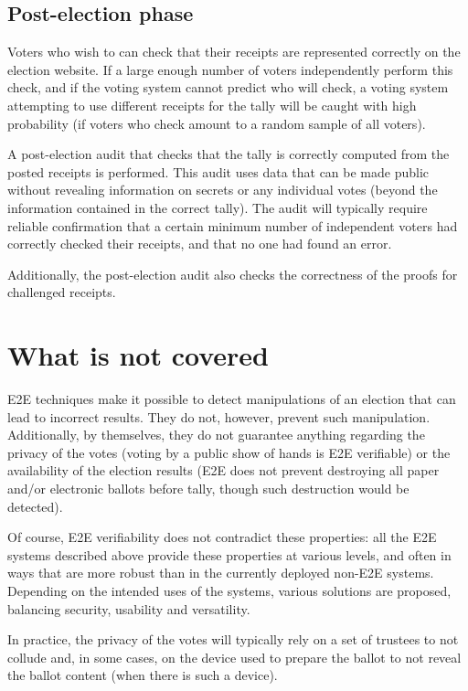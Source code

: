 \subsection{Post-election phase}

Voters who wish to can check that their receipts are represented correctly
on the election website. If a large enough number of voters independently
perform this check, and if the voting system cannot predict who will check,
a voting system attempting to use different receipts for the tally will be
caught with high probability (if voters who check amount to a random sample
of all voters).

A post-election audit that checks that the tally is correctly computed from
the posted receipts is performed. This audit uses data that can be made
public without revealing information on secrets or any individual votes
(beyond the information contained in the correct tally). The audit will
typically require reliable confirmation that a certain minimum number of
independent voters had correctly checked their receipts, and that no one had
found an error.

Additionally, the post-election audit also checks the correctness of the
proofs for challenged receipts.

\section{What is not covered}

E2E techniques make it possible to detect manipulations of an election that
can lead to incorrect results. They do not, however, prevent such
manipulation. Additionally, by themselves, they do not guarantee anything
regarding the privacy of the votes (voting by a public show of hands is E2E
verifiable) or the availability of the election results (E2E does not
prevent destroying all paper and/or electronic ballots before tally, though
such destruction would be detected).

Of course, E2E verifiability does not contradict these properties: all the
E2E systems described above provide these properties at various levels, and
often in ways that are more robust than in the currently deployed non-E2E
systems. Depending on the intended uses of the systems, various solutions
are proposed, balancing security, usability and versatility.

In practice, the privacy of the votes will typically rely on a set of
trustees to not collude and, in some cases, on the device used to prepare
the ballot to not reveal the ballot content (when there is such a device).

